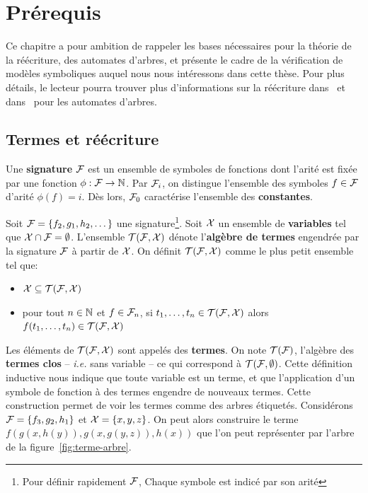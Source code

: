 \chapter{Prérequis}
\label{chap:preliminaires}

Ce chapitre a pour ambition de rappeler les bases nécessaires pour la théorie de la réécriture,
des automates d'arbres, et présente le cadre de la vérification de modèles symboliques auquel
nous nous intéressons dans cette thèse. Pour plus détails, le lecteur pourra trouver plus d'informations
sur la réécriture dans~\cite{BaaderN-book98} et dans~\cite{TATA} pour les automates d'arbres.


\section{Termes et réécriture}

\begin{definition}
  Une \textbf{signature} $\mathcal{F}$ est un ensemble de symboles de fonctions dont l'arité est fixée par
  une fonction $\phi : \mathcal{F} \rightarrow \mathbb{N}$. Par $\mathcal{F}_i$, on distingue l'ensemble des symboles $ f \in \mathcal{F}$
  d'arité $\phi(f) = i$. Dès lors, $\mathcal{F}_0$ caractérise l'ensemble des \textbf{constantes}.
\end{definition}


\begin{definition}
  Soit $\mathcal{F} = \{ f_2, g_1, h_2, \dots\}$ une signature\footnote{\footnotesize Pour définir rapidement $\mathcal{F}$, Chaque symbole est indicé par son arité}.
  Soit $\mathcal X$ un ensemble de \textbf{variables} tel que $\mathcal X \cap \mathcal{F} = \emptyset$.
  L'ensemble $\mathcal{T(F, X)}$ dénote l'\textbf{algèbre de termes} engendrée par la signature $\mathcal{F}$ à partir de $\mathcal X$. On définit $\mathcal{T(F, X)}$ comme le plus petit ensemble
  tel que:
  \begin{itemize}
  \item $\mathcal X \subseteq \mathcal{T(F, X)}$ 
  \item pour tout $n \in \mathbb{N}$ et $f \in \mathcal{F}_n$, si $t_1, \dots, t_n \in \mathcal{T(F, X)}$ alors $f(t_1, \dots, t_n) \in \mathcal{T(F, X)}$
  \end{itemize}
\end{definition}
Les éléments de $\mathcal{T(F, X)}$ sont appelés des \textbf{termes}. On note $\mathcal{T(F)}$, l'algèbre des \textbf{termes clos} -- \textit{i.e.} 
sans variable -- ce qui correspond à $\mathcal T(\mathcal{F},\emptyset)$. %
Cette définition inductive nous indique que toute variable est un terme, 
et que l'application d'un symbole de fonction à des termes engendre de nouveaux termes. Cette construction permet de voir
les termes comme des arbres étiquetés.
Considérons $\mathcal{F} = \{ f_3, g_2, h_1 \}$ et $\mathcal X = \{x, y, z\}$. On peut alors construire le terme $f(g(x,h(y)), g(x, g(y, z)), h(x))$
que l'on peut représenter par l'arbre de la figure~\ref{fig:terme-arbre}.


